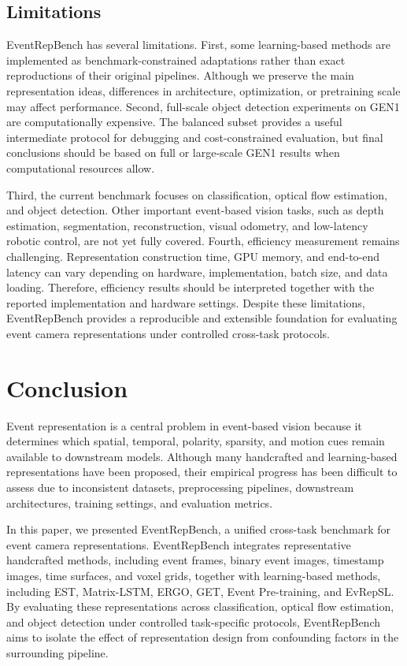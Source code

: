 \documentclass[letterpaper]{article}
\begin{document}
\subsection{Limitations}
EventRepBench has several limitations. First, some learning-based methods are implemented as benchmark-constrained adaptations rather than exact reproductions of their original pipelines. Although we preserve the main representation ideas, differences in architecture, optimization, or pretraining scale may affect performance. Second, full-scale object detection experiments on GEN1 are computationally expensive. The balanced subset provides a useful intermediate protocol for debugging and cost-constrained evaluation, but final conclusions should be based on full or large-scale GEN1 results when computational resources allow.

Third, the current benchmark focuses on classification, optical flow estimation, and object detection. Other important event-based vision tasks, such as depth estimation, segmentation, reconstruction, visual odometry, and low-latency robotic control, are not yet fully covered. Fourth, efficiency measurement remains challenging. Representation construction time, GPU memory, and end-to-end latency can vary depending on hardware, implementation, batch size, and data loading. Therefore, efficiency results should be interpreted together with the reported implementation and hardware settings. Despite these limitations, EventRepBench provides a reproducible and extensible foundation for evaluating event camera representations under controlled cross-task protocols.

\section{Conclusion}
Event representation is a central problem in event-based vision because it determines which spatial, temporal, polarity, sparsity, and motion cues remain available to downstream models. Although many handcrafted and learning-based representations have been proposed, their empirical progress has been difficult to assess due to inconsistent datasets, preprocessing pipelines, downstream architectures, training settings, and evaluation metrics.

In this paper, we presented EventRepBench, a unified cross-task benchmark for event camera representations. EventRepBench integrates representative handcrafted methods, including event frames, binary event images, timestamp images, time surfaces, and voxel grids, together with learning-based methods, including EST, Matrix-LSTM, ERGO, GET, Event Pre-training, and EvRepSL. By evaluating these representations across classification, optical flow estimation, and object detection under controlled task-specific protocols, EventRepBench aims to isolate the effect of representation design from confounding factors in the surrounding pipeline.
\end{document}
